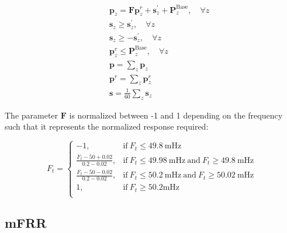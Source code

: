 \documentclass[lettersize,journal]{IEEEtran}
\begin{document}
\begin{subequations} \label{P1:constraints}
    \begin{align}
              & \bm{p}_{z} = \bm{F} \bm{p}^{r}_{z} + \bm{s}^{\prime}_{z} + \bm{P}^{\text{Base}}_{z}, \quad \forall{z}  \label{P1:co2} \\
        \quad & \bm{s}_{z} \geq \bm{s}^{\prime}_{z}, \quad \forall{z}  \label{P1:co3}
        \\
        \quad & \bm{s}_{z} \geq -\bm{s}^{\prime}_{z}, \quad \forall{z}  \label{P1:co4}
        \\
        \quad & \bm{p}^{r}_{z} \leq \bm{P}_{z}^{\text{Base}} , \quad \forall{z} \label{P1:co8}
        \\
        \quad & \bm{p} = \sum_{z} \bm{p}_{z}   \label{P1:co5}                                                                         \\
        \quad & \bm{p}^{r} = \sum_{z} \bm{p}^{r}_{z}   \label{P1:co6}                                                                 \\
        \quad & \bm{s} = \frac{1}{60} \sum_{z} \bm{s}_{z}   \label{P1:co7}
    \end{align}
\end{subequations}

The parameter $\bm{F}$ is normalized between -1 and 1 depending on the frequency such that it represents the normalized response required:

\begin{equation}
    F_{t} =
    \begin{cases}
        -1,                             & \text{if}\ F_{t} \leq 49.8\ \text{mHz}                                           \\
        \frac{F_{t}-50+0.02}{0.2-0.02}, & \text{if}\ F_{t} \leq 49.98\ \text{mHz}\ \text{and}\ F_{t} \geq 49.8\ \text{mHz} \\
        \frac{F_{t}-50-0.02}{0.2-0.02}, & \text{if}\ F_{t} \leq 50.2\ \text{mHz}\ \text{and}\ F_{t} \geq 50.02\ \text{mHz} \\
        1,                              & \text{if}\ F_{t} \geq 50.2 \text{mHz}                                            \\
    \end{cases}
\end{equation}

\subsection{mFRR}
\end{document}
